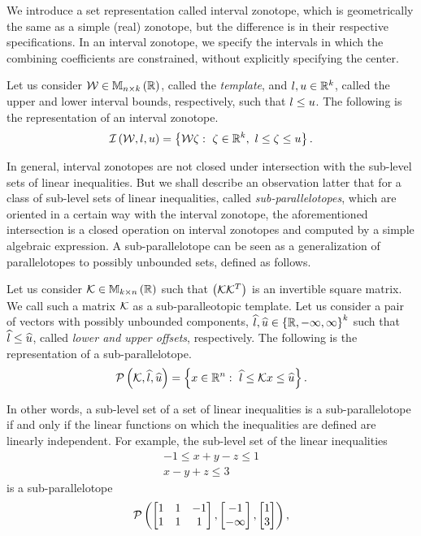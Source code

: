 We introduce a set representation called interval zonotope, which is
geometrically the same as a simple (real) zonotope, but the difference
is in their respective specifications.  In an interval zonotope, we
specify the intervals in which the combining coefficients are
constrained, without explicitly specifying the center.
%
\begin{definition}
Let us consider $\mathcal{W}\in\mathbb{M}_{n\times k}\left(\mathbb{R}\right)$, called the {\it
  template}, and $l,u\in\mathbb{R}^k$, called the upper and lower
interval bounds, respectively, such that $l\leq u$.  The following
is the representation of an interval zonotope.
%
\[
\mathit{\operatorname{\mathcal{I}}}\left(\mathcal{W},l,u\right)=\left\{\mathcal{W}\zeta:~\zeta\in\mathbb{R}^k,~l\leq\zeta\leq u\right\}.
\]
%
\end{definition}
%
In general, interval zonotopes are not closed under intersection with
the sub-level sets of linear inequalities. But we shall describe an
observation latter that for a class of sub-level sets of linear
inequalities, called \emph{sub-parallelotopes}, which are oriented in
a certain way with the interval zonotope, the aforementioned
intersection is a closed operation on interval zonotopes and computed
by a simple algebraic expression. A sub-parallelotope can be seen as a
generalization of parallelotopes to possibly unbounded sets, defined
as follows.
%
\begin{definition}
Let us consider ${\mathcal{K}}\in\mathbb{M}_{k\times n}\left(\mathbb{R}\right)$ such that
$\left(\mathcal{K}{\mathcal{K}}^T\right)$ is an invertible square matrix.  We
call such a matrix $\mathcal{K}$ as a sub-paralleotopic template.  Let us
consider a pair of vectors with possibly unbounded components,
$\widehat{l},\widehat{u}\in\left\{\mathbb{R},-\infty,\infty\right\}^k$ such that $\widehat{l}\leq\widehat{u}$,
called {\it lower and upper offsets}, respectively.  The following is
the representation of a sub-parallelotope.
%
\[
\mathcal{P}\left(\mathcal{K},\widehat{l},\widehat{u}\right)=\left\{x\in\mathbb{R}^n:~\widehat{l}\leq\mathcal{K} x\leq\widehat{u}\right\}.
\]
%
\end{definition}
%
In other words, a sub-level set of a set of linear inequalities is a
sub-parallelotope if and only if the linear functions on which the
inequalities are defined are linearly independent. For example, the
sub-level set of the linear inequalities
%
\begin{align*}
-1\leq x+y-z\leq 1\\
x-y+z\leq 3
\end{align*}
%
is a sub-parallelotope
%
\[
\mathcal{P}\left(\left[\begin{matrix}
    1 & 1 & -1\\
    1 & 1 & 1
  \end{matrix}
  \right],\left[
    \begin{matrix}
      -1\\
      -\infty
    \end{matrix}
    \right]
,\left[
    \begin{matrix}
      1\\
      3
    \end{matrix}
    \right]
\right),
\]
